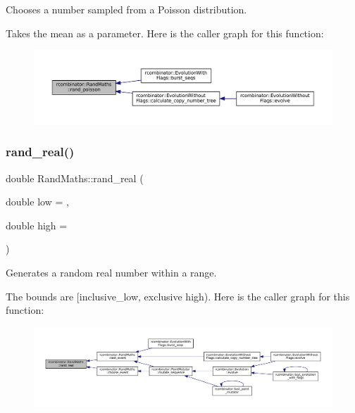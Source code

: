 Chooses a number sampled from a Poisson distribution. 

Takes the mean as a parameter. Here is the caller graph for this function\+:
\nopagebreak
\begin{figure}[H]
\begin{center}
\leavevmode
\includegraphics[width=350pt]{classrcombinator_1_1RandMaths_adef66efd4d58f6130982ff0ee0e25750_icgraph}
\end{center}
\end{figure}
\mbox{\label{classrcombinator_1_1RandMaths_aa6441baa59bff50f588c0c54e3c54140}} 
\subsubsection{\texorpdfstring{rand\+\_\+real()}{rand\_real()}}
{\footnotesize\ttfamily double Rand\+Maths\+::rand\+\_\+real (\begin{DoxyParamCaption}\item[{double}]{low = {},  }\item[{double}]{high = {} }\end{DoxyParamCaption})}



Generates a random real number within a range. 

The bounds are \mbox{[}inclusive\+\_\+low, exclusive high). Here is the caller graph for this function\+:
\nopagebreak
\begin{figure}[H]
\begin{center}
\leavevmode
\includegraphics[width=350pt]{classrcombinator_1_1RandMaths_aa6441baa59bff50f588c0c54e3c54140_icgraph}
\end{center}
\end{figure}
\mbox{\label{classrcombinator_1_1RandMaths_a2758ba7c9818bc664c4b751a697e1fe6}} 
